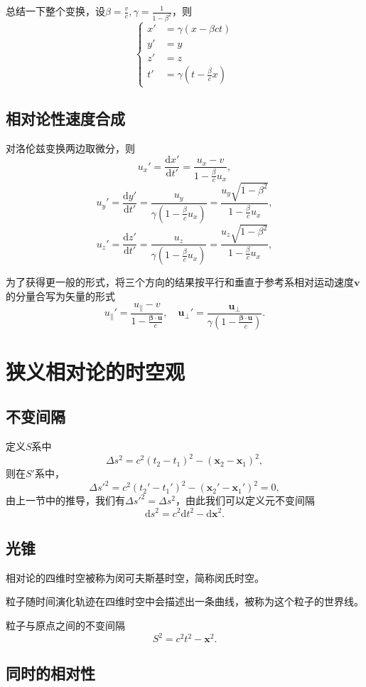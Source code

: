 \documentclass[UTF8]{ctexbook}
\renewcommand{\d}{\mathrm{d}}
\renewcommand{\b}{\boldsymbol}
\numberwithin{equation}{chapter}
\begin{document}
	总结一下整个变换，设$\beta=\frac{v}{c},\gamma=\frac{1}{1-\beta^2}$，则
	\[\left\{\begin{aligned}
		x'&=\gamma(x-\beta ct) \\
		y'&=y \\
		z'&=z \\
		t'&=\gamma\left(t-\frac{\beta}{c}x\right)
	\end{aligned}
	\right.\]
	
	\subsection{相对论性速度合成}
	对洛伦兹变换两边取微分，则
	\[u_x'=\frac{\d x'}{\d t'}=\frac{u_x-v}{1-\frac{\beta}{c}u_x},\]
	\[u_y'=\frac{\d y'}{\d t'}=\frac{u_y}{\gamma\left(1-\frac{\beta}{c}u_x\right)}=\frac{u_y\sqrt{1-\beta^2}}{1-\frac{\beta}{c}u_x},\]
	\[u_z'=\frac{\d z'}{\d t'}=\frac{u_z}{\gamma\left(1-\frac{\beta}{c}u_x\right)}=\frac{u_z\sqrt{1-\beta^2}}{1-\frac{\beta}{c}u_x},\]
	
	为了获得更一般的形式，将三个方向的结果按平行和垂直于参考系相对运动速度$\b{v}$的分量合写为矢量的形式
	\[u_{\parallel}'=\frac{u_{\parallel}-v}{1-\frac{\b{\beta}\cdot\b{u}}{c}},\quad \b{u}_{\perp}'=\frac{\b{u}_\perp}{\gamma\left(1-\frac{\b{\beta}\cdot\b{u}}{c}\right)}.\]
	
	\section{狭义相对论的时空观}
	
	\subsection{不变间隔}
	定义$S$系中
	\[\Delta s^2=c^2(t_2-t_1)^2-(\b{x}_2-\b{x}_1)^2,\]
	则在$S'$系中，
	\[\Delta s'^2=c^2(t_2'-t_1')^2-(\b{x}_2'-\b{x}_1')^2=0,\]
	由上一节中的推导，我们有$\Delta s'^2=\Delta s^2$，由此我们可以定义元不变间隔
	\[\d s^2=c^2 \d t^2-\d \b{x}^2.\]
	
	\subsection{光锥}
	相对论的四维时空被称为闵可夫斯基时空，简称闵氏时空。
	
	粒子随时间演化轨迹在四维时空中会描述出一条曲线，被称为这个粒子的世界线。
	
	粒子与原点之间的不变间隔
	\[S^2=c^2t^2-\b{x}^2.\]
	
	\subsection{同时的相对性}
	
\end{document}
